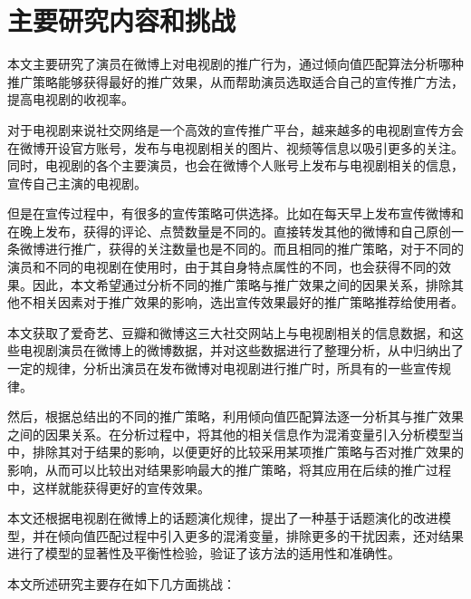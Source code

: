 \section{主要研究内容和挑战}

本文主要研究了演员在微博上对电视剧的推广行为，通过倾向值匹配算法分析哪种推广策略能够获得最好的推广效果，从而帮助演员选取适合自己的宣传推广方法，提高电视剧的收视率。

对于电视剧来说社交网络是一个高效的宣传推广平台，越来越多的电视剧宣传方会在微博开设官方账号，发布与电视剧相关的图片、视频等信息以吸引更多的关注。同时，电视剧的各个主要演员，也会在微博个人账号上发布与电视剧相关的信息，宣传自己主演的电视剧。

但是在宣传过程中，有很多的宣传策略可供选择。比如在每天早上发布宣传微博和在晚上发布，获得的评论、点赞数量是不同的。直接转发其他的微博和自己原创一条微博进行推广，获得的关注数量也是不同的。而且相同的推广策略，对于不同的演员和不同的电视剧在使用时，由于其自身特点属性的不同，也会获得不同的效果。因此，本文希望通过分析不同的推广策略与推广效果之间的因果关系，排除其他不相关因素对于推广效果的影响，选出宣传效果最好的推广策略推荐给使用者。

本文获取了爱奇艺、豆瓣和微博这三大社交网站上与电视剧相关的信息数据，和这些电视剧演员在微博上的微博数据，并对这些数据进行了整理分析，从中归纳出了一定的规律，分析出演员在发布微博对电视剧进行推广时，所具有的一些宣传规律。

然后，根据总结出的不同的推广策略，利用倾向值匹配算法逐一分析其与推广效果之间的因果关系。在分析过程中，将其他的相关信息作为混淆变量引入分析模型当中，排除其对于结果的影响，以便更好的比较采用某项推广策略与否对推广效果的影响，从而可以比较出对结果影响最大的推广策略，将其应用在后续的推广过程中，这样就能获得更好的宣传效果。

本文还根据电视剧在微博上的话题演化规律，提出了一种基于话题演化的改进模型，并在倾向值匹配过程中引入更多的混淆变量，排除更多的干扰因素，还对结果进行了模型的显著性及平衡性检验，验证了该方法的适用性和准确性。

本文所述研究主要存在如下几方面挑战：

